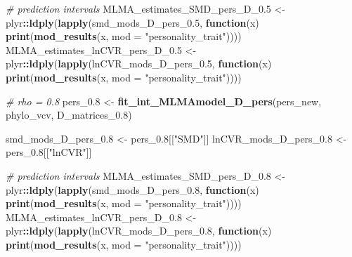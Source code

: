 \documentclass[]{article}
\newenvironment{Shaded}{\begin{snugshade}}{\end{snugshade}}
\newcommand{\KeywordTok}[1]{\textcolor[rgb]{0.13,0.29,0.53}{\textbf{#1}}}
\newcommand{\DataTypeTok}[1]{\textcolor[rgb]{0.13,0.29,0.53}{#1}}
\newcommand{\FloatTok}[1]{\textcolor[rgb]{0.00,0.00,0.81}{#1}}
\newcommand{\StringTok}[1]{\textcolor[rgb]{0.31,0.60,0.02}{#1}}
\newcommand{\CommentTok}[1]{\textcolor[rgb]{0.56,0.35,0.01}{\textit{#1}}}
\newcommand{\ControlFlowTok}[1]{\textcolor[rgb]{0.13,0.29,0.53}{\textbf{#1}}}
\newcommand{\OperatorTok}[1]{\textcolor[rgb]{0.81,0.36,0.00}{\textbf{#1}}}
\newcommand{\NormalTok}[1]{#1}
\begin{document}
\begin{Shaded}
\begin{Highlighting}[]
    \CommentTok{# prediction intervals}
\NormalTok{    MLMA_estimates_SMD_pers_D_}\FloatTok{0.5}\NormalTok{ <-}\StringTok{ }\NormalTok{plyr}\OperatorTok{::}\KeywordTok{ldply}\NormalTok{(}\KeywordTok{lapply}\NormalTok{(smd_mods_D_pers_}\FloatTok{0.5}\NormalTok{, }
                           \ControlFlowTok{function}\NormalTok{(x) }\KeywordTok{print}\NormalTok{(}\KeywordTok{mod_results}\NormalTok{(x, }\DataTypeTok{mod =} \StringTok{"personality_trait"}\NormalTok{)))) }
\NormalTok{    MLMA_estimates_lnCVR_pers_D_}\FloatTok{0.5}\NormalTok{ <-}\StringTok{ }\NormalTok{plyr}\OperatorTok{::}\KeywordTok{ldply}\NormalTok{(}\KeywordTok{lapply}\NormalTok{(lnCVR_mods_D_pers_}\FloatTok{0.5}\NormalTok{, }
                              \ControlFlowTok{function}\NormalTok{(x) }\KeywordTok{print}\NormalTok{(}\KeywordTok{mod_results}\NormalTok{(x, }\DataTypeTok{mod =} \StringTok{"personality_trait"}\NormalTok{)))) }

  \CommentTok{# rho = 0.8}
\NormalTok{    pers_}\FloatTok{0.8}\NormalTok{ <-}\StringTok{ }\KeywordTok{fit_int_MLMAmodel_D_pers}\NormalTok{(pers_new, phylo_vcv, D_matrices_}\FloatTok{0.8}\NormalTok{)}
    
\NormalTok{    smd_mods_D_pers_}\FloatTok{0.8}\NormalTok{ <-}\StringTok{ }\NormalTok{pers_}\FloatTok{0.8}\NormalTok{[[}\StringTok{"SMD"}\NormalTok{]] }
\NormalTok{    lnCVR_mods_D_pers_}\FloatTok{0.8}\NormalTok{ <-}\StringTok{ }\NormalTok{pers_}\FloatTok{0.8}\NormalTok{[[}\StringTok{"lnCVR"}\NormalTok{]] }
  
    \CommentTok{# prediction intervals}
\NormalTok{    MLMA_estimates_SMD_pers_D_}\FloatTok{0.8}\NormalTok{ <-}\StringTok{ }\NormalTok{plyr}\OperatorTok{::}\KeywordTok{ldply}\NormalTok{(}\KeywordTok{lapply}\NormalTok{(smd_mods_D_pers_}\FloatTok{0.8}\NormalTok{, }
                           \ControlFlowTok{function}\NormalTok{(x) }\KeywordTok{print}\NormalTok{(}\KeywordTok{mod_results}\NormalTok{(x, }\DataTypeTok{mod =} \StringTok{"personality_trait"}\NormalTok{)))) }
\NormalTok{    MLMA_estimates_lnCVR_pers_D_}\FloatTok{0.8}\NormalTok{ <-}\StringTok{ }\NormalTok{plyr}\OperatorTok{::}\KeywordTok{ldply}\NormalTok{(}\KeywordTok{lapply}\NormalTok{(lnCVR_mods_D_pers_}\FloatTok{0.8}\NormalTok{, }
                              \ControlFlowTok{function}\NormalTok{(x) }\KeywordTok{print}\NormalTok{(}\KeywordTok{mod_results}\NormalTok{(x, }\DataTypeTok{mod =} \StringTok{"personality_trait"}\NormalTok{)))) }
\end{Highlighting}
\end{Shaded}
\end{document}
